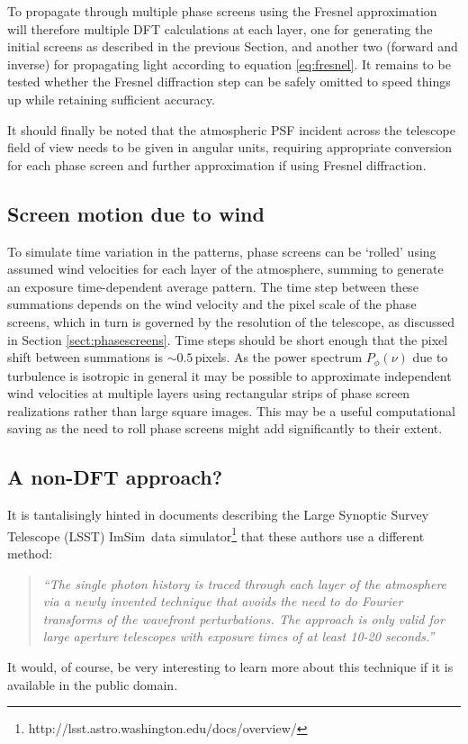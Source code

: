 \documentclass[preprint]{aastex}
\newcommand{\imsim}{{\sc ImSim}}
\begin{document}
To propagate through multiple phase screens using the Fresnel
approximation will therefore multiple DFT calculations at each layer,
one for generating the initial screens as described in the previous
Section, and another two (forward and inverse) for propagating light
according to equation \eqref{eq:fresnel}.  It remains to be tested
whether the Fresnel diffraction step can be safely omitted to speed
things up while retaining sufficient accuracy.

It should finally be noted that the atmospheric PSF incident across
the telescope field of view needs to be given in angular units, requiring
appropriate conversion for each phase screen and further approximation if using Fresnel diffraction.

\subsection{Screen motion due to wind}\label{sect:wind}
To simulate time variation in the patterns, phase screens can be
`rolled' using assumed wind velocities for each layer of the
atmosphere, summing to generate an exposure time-dependent average pattern.  The time step between
these summations depends on the wind velocity and the pixel scale of the phase screens, which in
turn is governed by the resolution of the telescope, as discussed in
Section \ref{sect:phasescreens}. Time
steps should be short enough that the pixel shift between summations is $\sim 0.5$\,pixels.
As the power spectrum $P_{\phi}(\nu)$ due to turbulence
is isotropic in general it may be possible to approximate independent
wind velocities at multiple layers using rectangular strips of phase screen
realizations rather than large square images.  This may be a useful
computational saving as the need to roll phase screens might add
significantly to their extent.



\subsection{A non-DFT approach?}\label{sect:lsst}
It is tantalisingly hinted in documents describing the Large Synoptic
Survey Telescope (LSST) \imsim\ data
simulator\footnote{http://lsst.astro.washington.edu/docs/overview/}
that these authors use a different method:
\begin{quote}
\emph{``The single
photon history is traced through each layer of the
atmosphere via a newly invented technique that
avoids the need to do Fourier transforms of the
wavefront perturbations. The approach is only
valid for large aperture telescopes with exposure
times of at least 10-20 seconds.''}
\end{quote}
It would, of course, be very interesting to learn more about this
technique if it is available in the public domain.
\end{document}

